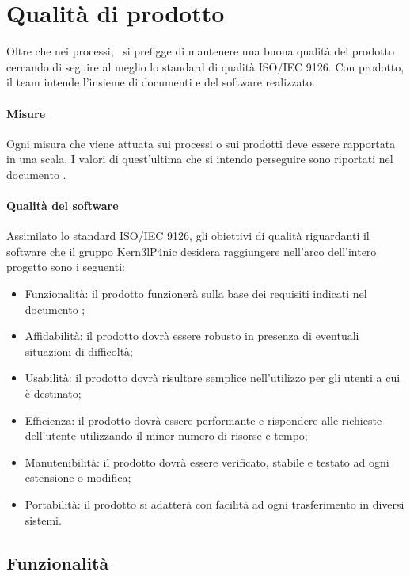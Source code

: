 \documentclass[../PianoDiQualifica.tex]{subfiles}
\begin{document}
	\section{Qualità di prodotto}
	Oltre che nei processi, \kpanic\ si prefigge di mantenere una buona qualità del prodotto cercando di seguire al meglio lo standard di qualità ISO/IEC 9126. Con prodotto, il team intende l'insieme di documenti e del software realizzato.
	
		\paragraph{Misure}
			Ogni misura che viene attuata sui processi o sui prodotti deve essere rapportata in una scala. I valori di quest'ultima che si intendo perseguire sono riportati nel documento \pianodiqualificav. 
			
		\paragraph{Qualità del software}
			Assimilato lo standard ISO/IEC 9126, gli obiettivi di qualità riguardanti il software che il gruppo Kern3lP4nic desidera raggiungere nell'arco dell'intero progetto sono i seguenti:
			\begin{itemize}
				\item Funzionalità: il prodotto funzionerà sulla base dei requisiti indicati nel documento \analisideirequisitiv;
				\item Affidabilità: il prodotto dovrà essere robusto in presenza di eventuali situazioni di difficoltà;
				\item Usabilità: il prodotto dovrà risultare semplice nell'utilizzo per gli utenti a cui è destinato;
				\item Efficienza: il prodotto dovrà essere performante e rispondere alle richieste dell'utente utilizzando il minor numero di risorse e tempo;
				\item Manutenibilità: il prodotto dovrà essere verificato, stabile e testato ad ogni estensione o modifica;
				\item Portabilità: il prodotto si adatterà con facilità ad ogni trasferimento in diversi sistemi.
			\end{itemize}

			\subsection{Funzionalità}
\end{document}
